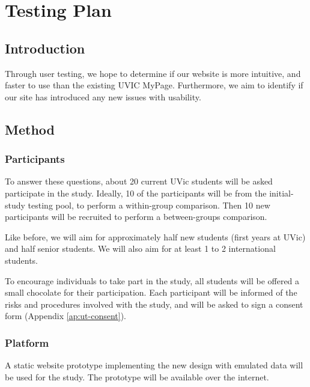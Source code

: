 \documentclass{article}
\begin{document}

\section{Testing Plan}

\subsection{Introduction}

Through user testing, we hope to determine if our website is more intuitive, and faster to use than the existing UVIC MyPage. Furthermore, we aim to identify if our site has introduced any new issues with usability.

\subsection{Method}

\subsubsection{Participants}

To answer these questions, about 20 current UVic students will be asked participate in the study. Ideally, 10 of the participants will be from the initial-study testing pool, to perform a within-group comparison. Then 10 new participants will be recruited to perform a between-groups comparison. 

Like before, we will aim for approximately half new students (first years at UVic) and half senior students. We will also aim for at least 1 to 2 international students.

To encourage individuals to take part in the study, all students will be offered a small chocolate for their participation. Each participant will be informed of the risks and procedures involved with the study, and will be asked to sign a consent form (Appendix \ref{ap:ut-consent}).

\subsubsection{Platform}

A static website prototype implementing the new design with emulated data will be used for the study. The prototype will be available over the internet.
\end{document}

